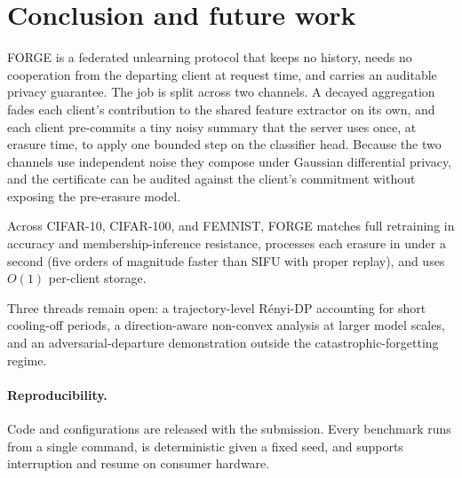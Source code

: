 \section{Conclusion and future work}
\label{sec:conclusion}

FORGE is a federated unlearning protocol that keeps no history, needs no
cooperation from the departing client at request time, and carries an auditable
privacy guarantee. The job is split across two channels. A decayed aggregation
fades each client's contribution to the shared feature extractor on its own,
and each client pre-commits a tiny noisy summary that the server uses once, at
erasure time, to apply one bounded step on the classifier head. Because the two
channels use independent noise they compose under Gaussian differential privacy,
and the certificate can be audited against the client's commitment without
exposing the pre-erasure model.

Across CIFAR-10, CIFAR-100, and FEMNIST, FORGE matches full retraining in
accuracy and membership-inference resistance, processes each erasure in under a
second (five orders of magnitude faster than SIFU with proper replay), and uses
$O(1)$ per-client storage.

Three threads remain open: a trajectory-level R\'enyi-DP accounting for short
cooling-off periods, a direction-aware non-convex analysis at larger model
scales, and an adversarial-departure demonstration outside the
catastrophic-forgetting regime.

\paragraph{Reproducibility.}
Code and configurations are released with the submission. Every benchmark runs
from a single command, is deterministic given a fixed seed, and supports
interruption and resume on consumer hardware.
